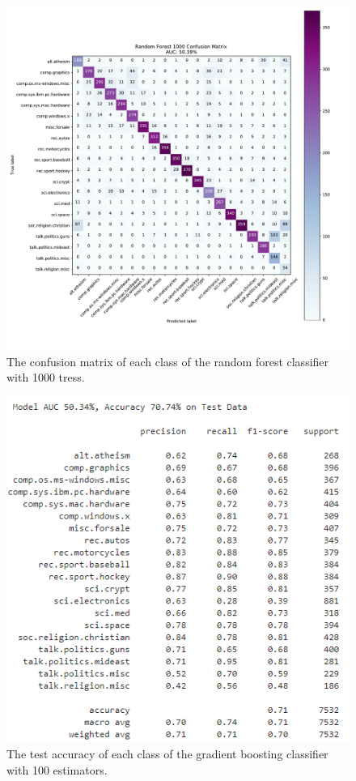 \documentclass[twocolumn]{extarticle}
\begin{document}
\begin{appendices}
\begin{figure}[H]
\centering
\includegraphics[width=0.9\linewidth]{"charts/Random Forest 1000"}
\caption{The confusion matrix of each class of the random forest classifier with 1000 tress.}
\label{chart:random-forest-1000-conf}
\end{figure}

\begin{figure}[H]
\centering
\includegraphics[width=0.9\linewidth]{charts/gb-100-acc}
\caption{The test accuracy of each class of the gradient boosting classifier with 100 estimators.}
\label{chart:gb-100-acc}
\end{figure}


\end{appendices}
\end{document}
